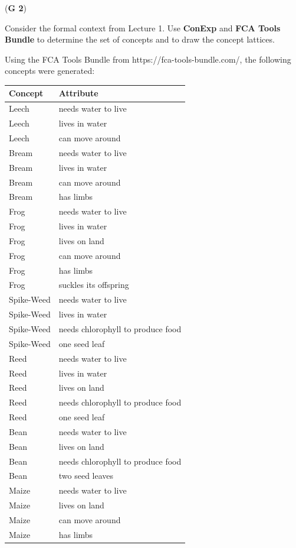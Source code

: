 \documentclass{article}
\begin{document}
\begin{enumerate}[label=\alph*)]
\newpage

\left(\textbf{G 2}\right)

Consider the formal context from Lecture 1. Use \textbf{ConExp} and \textbf{FCA Tools Bundle} to determine the set of concepts and to draw the concept lattices.

Using the FCA Tools Bundle from https://fca-tools-bundle.com/, the following concepts were generated:

\begin{table}[htbp]
\centering
\begin{tabular}{|l|l|}
\hline
\textbf{Concept} & \textbf{Attribute} \\
\hline\hline
Leech & needs water to live \\
\hline
Leech & lives in water \\
\hline
Leech & can move around \\
\hline
Bream & needs water to live \\
\hline
Bream & lives in water \\
\hline
Bream & can move around \\
\hline
Bream & has limbs \\
\hline
Frog & needs water to live \\
\hline
Frog & lives in water \\
\hline
Frog & lives on land \\
\hline
Frog & can move around \\
\hline
Frog & has limbs \\
\hline
Frog & suckles its offspring \\
\hline
Spike-Weed & needs water to live \\
\hline
Spike-Weed & lives in water \\
\hline
Spike-Weed & needs chlorophyll to produce food \\
\hline
Spike-Weed & one seed leaf \\
\hline
Reed & needs water to live \\
\hline
Reed & lives in water \\
\hline
Reed & lives on land \\
\hline
Reed & needs chlorophyll to produce food \\
\hline
Reed & one seed leaf \\
\hline
Bean & needs water to live \\
\hline
Bean & lives on land \\
\hline
Bean & needs chlorophyll to produce food \\
\hline
Bean & two seed leaves \\
\hline
Maize & needs water to live \\
\hline
Maize & lives on land \\
\hline
Maize & can move around \\
\hline
Maize & has limbs \\
\hline
\end{tabular}
\label{tab:organism_characteristics}
\end{table}


\end{enumerate}
\end{document}
